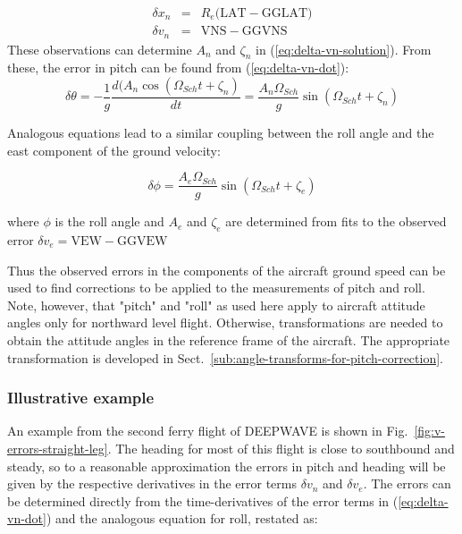 \documentclass[12pt,twoside,english]{article}\usepackage[]{graphicx}\usepackage[]{color}
\let\OrgIndex\index
\renewcommand*{\index}[1]{\OrgIndex{#1}}
\begin{document}
{{\begin{eqnarray}
\delta x_{n} & = & R_{e}(\mathrm{LAT-GGLAT)}\nonumber \\ 
\delta v_{n} & = & \mathrm{VNS-GGVNS}\label{eq:observed-errors} 
\end{eqnarray}
These observations can determine $A_{n}$ and $\zeta_{n}$ in (\ref{eq:delta-vn-solution}). From these, the error in pitch can be found from (\ref{eq:delta-vn-dot}):\\ 
\begin{equation}
\delta\theta=-\frac{1}{g}\frac{d(A_{n}\cos(\Omega_{Sch}t+\zeta_{n})}{dt}=\frac{A_{n}\Omega_{Sch}}{g}\sin(\Omega_{Sch}t+\zeta_{n})\label{eq:solution-delta-theta} 
\end{equation}


Analogous equations lead to a similar coupling between the roll angle and the east component of the ground velocity: 

\begin{equation}
\delta\phi=\frac{A_{e}\Omega_{Sch}}{g}\sin(\Omega_{Sch}t+\zeta_{e})\label{eq:solution-delta-phi} 
\end{equation}


where $\phi$ is the roll angle and $A_{e}$ and $\zeta_{e}$ are determined from fits to the observed error $\delta v_{e}=\mathrm{VEW-GGVEW}$


Thus the observed errors in the components of the aircraft ground  speed can be used to find corrections to be applied to the measurements of pitch and roll. Note, however, that "pitch" and "roll" as used here apply to aircraft attitude angles only for northward level flight. Otherwise, transformations are needed to obtain the attitude angles in the reference frame of the aircraft. The appropriate transformation is developed in Sect.~\ref{sub:angle-transforms-for-pitch-correction}.


\subsubsection{Illustrative example}

An example from the second ferry flight of DEEPWAVE is shown in Fig.~\ref{fig:v-errors-straight-leg}. The heading for most of this flight is close to southbound and steady, so to a reasonable approximation the errors in pitch and heading will be given by the respective derivatives in the error terms $\delta v_{n}$ and $\delta v_{e}$. 
The errors can be determined directly from the time-derivatives of the error terms in (\ref{eq:delta-vn-dot}) and the analogous equation for roll, restated as: 

}}
\end{document}

